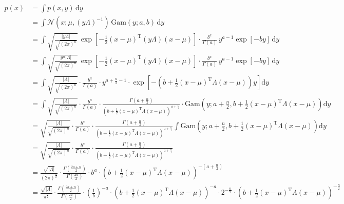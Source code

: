 \documentclass[a4paper,12pt]{book}
\begin{document}
\begin{equation} \label{eq:ng-marg-ng-marg-x-qed}
\begin{split}
p(x) &= \int p(x,y) \, \mathrm{d}y \\
&= \int \mathcal{N}(x; \mu, (y \Lambda)^{-1}) \, \mathrm{Gam}(y; a, b) \, \mathrm{d}y \\
&= \int \sqrt{\frac{|y \Lambda|}{\sqrt{(2 \pi)^n}}} \, \exp \left[ -\frac{1}{2} (x-\mu)^\mathrm{T} (y \Lambda) (x-\mu) \right] \cdot \frac{b^a}{\Gamma(a)} \, y^{a-1} \exp[-b y] \, \mathrm{d}y \\
&= \int \sqrt{\frac{y^n |\Lambda|}{\sqrt{(2 \pi)^n}}} \, \exp \left[ -\frac{1}{2} (x-\mu)^\mathrm{T} (y \Lambda) (x-\mu) \right] \cdot \frac{b^a}{\Gamma(a)} \, y^{a-1} \exp[-b y] \, \mathrm{d}y \\
&= \int \sqrt{\frac{|\Lambda|}{\sqrt{(2 \pi)^n}}} \cdot \frac{b^a}{\Gamma(a)} \cdot y^{a+\frac{n}{2}-1} \cdot \exp \left[ -\left( b + \frac{1}{2} (x-\mu)^\mathrm{T} \Lambda (x-\mu) \right) y \right] \mathrm{d}y \\
&= \int \sqrt{\frac{|\Lambda|}{\sqrt{(2 \pi)^n}}} \cdot \frac{b^a}{\Gamma(a)} \cdot \frac{\Gamma\left( a+\frac{n}{2} \right)}{\left( b + \frac{1}{2} (x-\mu)^\mathrm{T} \Lambda (x-\mu) \right)^{a+\frac{n}{2}}} \cdot \mathrm{Gam}\left( y; a+\frac{n}{2}, b + \frac{1}{2} (x-\mu)^\mathrm{T} \Lambda (x-\mu) \right) \mathrm{d}y \\
&= \sqrt{\frac{|\Lambda|}{\sqrt{(2 \pi)^n}}} \cdot \frac{b^a}{\Gamma(a)} \cdot \frac{\Gamma\left( a+\frac{n}{2} \right)}{\left( b + \frac{1}{2} (x-\mu)^\mathrm{T} \Lambda (x-\mu) \right)^{a+\frac{n}{2}}} \int \mathrm{Gam}\left( y; a+\frac{n}{2}, b + \frac{1}{2} (x-\mu)^\mathrm{T} \Lambda (x-\mu) \right) \mathrm{d}y \\
&= \sqrt{\frac{|\Lambda|}{\sqrt{(2 \pi)^n}}} \cdot \frac{b^a}{\Gamma(a)} \cdot \frac{\Gamma\left( a+\frac{n}{2} \right)}{\left( b + \frac{1}{2} (x-\mu)^\mathrm{T} \Lambda (x-\mu) \right)^{a+\frac{n}{2}}} \\
&= \frac{\sqrt{|\Lambda|}}{(2 \pi)^\frac{n}{2}} \cdot \frac{\Gamma\left( \frac{2a+n}{2} \right)}{\Gamma\left( \frac{2a}{2} \right)} \cdot b^a \cdot \left( b + \frac{1}{2} (x-\mu)^\mathrm{T} \Lambda (x-\mu) \right)^{-\left( a+\frac{n}{2} \right)} \\
&= \frac{\sqrt{|\Lambda|}}{\pi^\frac{n}{2}} \cdot \frac{\Gamma\left( \frac{2a+n}{2} \right)}{\Gamma\left( \frac{2a}{2} \right)} \cdot \left( \frac{1}{b} \right)^{-a} \cdot \left( b + \frac{1}{2} (x-\mu)^\mathrm{T} \Lambda (x-\mu) \right)^{-a} \cdot 2^{-\frac{n}{2}} \cdot \left( b + \frac{1}{2} (x-\mu)^\mathrm{T} \Lambda (x-\mu) \right)^{-\frac{n}{2}} \\

\end{split}
\end{equation}
\end{document}

